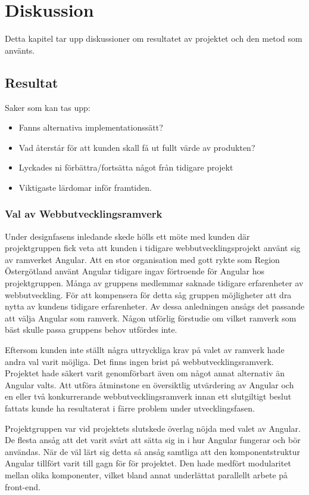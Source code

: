 \chapter{Diskussion}
Detta kapitel tar upp diskussioner om resultatet av projektet och den metod som använts.
\section{Resultat}
Saker som kan tas upp:
\begin{itemize}
\item Fanns alternativa implementationssätt?
\item Vad återstår för att kunden skall få ut fullt värde av produkten?
\item Lyckades ni förbättra/fortsätta något från tidigare projekt
\item Viktigaste lärdomar inför framtiden.
\end{itemize}

\subsection{Val av Webbutvecklingsramverk}

Under designfasens inledande skede hölls ett möte med kunden där projektgruppen fick veta att kunden i tidigare webbutvecklingsprojekt använt sig av ramverket Angular. Att en stor organisation med gott rykte som Region Östergötland använt Angular tidigare ingav förtroende för Angular hos projektgruppen. Många av gruppens medlemmar saknade tidigare erfarenheter av webbutveckling. För att kompensera för detta såg gruppen möjligheter att dra nytta av kundens tidigare erfarenheter. Av dessa anledningen ansågs det passande att välja Angular som ramverk. Någon utförlig förstudie om vilket ramverk som bäst skulle passa gruppens behov utfördes inte.

Eftersom kunden inte ställt några uttryckliga krav på valet av ramverk hade andra val varit möjliga. Det finns ingen brist på webbutvecklingsramverk. Projektet hade säkert varit genomförbart även om något annat alternativ än Angular valts. Att utföra åtminstone en översiktlig utvärdering av Angular och en eller två konkurrerande webbutvecklingsramverk innan ett slutgiltigt beslut fattats kunde ha resultaterat i färre problem under utvecklingsfasen.

Projektgruppen var vid projektets slutskede överlag nöjda med valet av Angular. De flesta ansåg att det varit svårt att sätta sig in i hur Angular fungerar och bör användas. När de väl lärt sig detta så ansåg samtliga att den komponentstruktur Angular tillfört varit till gagn för för projektet. Den hade medfört modularitet mellan olika komponenter, vilket bland annat underlättat parallellt arbete på front-end. 

